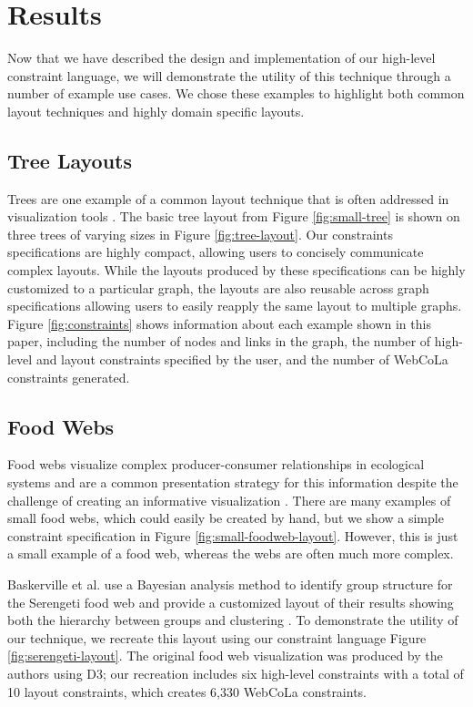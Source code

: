 \section{Results}
\numConstraints
Now that we have described the design and implementation of our high-level constraint language, we will demonstrate the utility of this technique through a number of example use cases. We chose these examples to highlight both common layout techniques and highly domain specific layouts. 

\subsection{Tree Layouts}
\serengetiLayout
Trees are one example of a common layout technique that is often addressed in visualization tools \cite{bostock:d3,WebCoLa,ellson2001graphviz,bastian2009gephi}. The basic tree layout from Figure \ref{fig:small-tree} is shown on three trees of varying sizes in Figure \ref{fig:tree-layout}. Our constraints specifications are highly compact, allowing users to concisely communicate complex layouts. While the layouts produced by these specifications can be highly customized to a particular graph, the layouts are also reusable across graph specifications allowing users to easily reapply the same layout to multiple graphs. Figure \ref{fig:constraints} shows information about each example shown in this paper, including the number of nodes and links in the graph, the number of high-level and layout constraints specified by the user, and the number of WebCoLa constraints generated.

\subsection{Food Webs}
\smallFoodWebLayout
Food webs visualize complex producer-consumer relationships in ecological systems and are a common presentation strategy for this information despite the challenge of creating an informative visualization \cite{baskerville2011spatial,lavigne1996cod,yodzis1998local,cohen2003ecological,kearney2016blog,benson2016higher}. There are many examples of small food webs, which could easily be created by hand, but we show a simple constraint specification in Figure \ref{fig:small-foodweb-layout}. However, this is just a small example of a food web, whereas the webs are often much more complex.

Baskerville et al. use a Bayesian analysis method to identify group structure for the Serengeti food web and provide a customized layout of their results showing both the hierarchy between groups and clustering \cite{baskerville2011spatial}. To demonstrate the utility of our technique, we recreate this layout using our constraint language Figure \ref{fig:serengeti-layout}. The original food web visualization was produced by the authors using D3; our recreation includes six high-level constraints with a total of 10 layout constraints, which creates 6,330 WebCoLa constraints.

